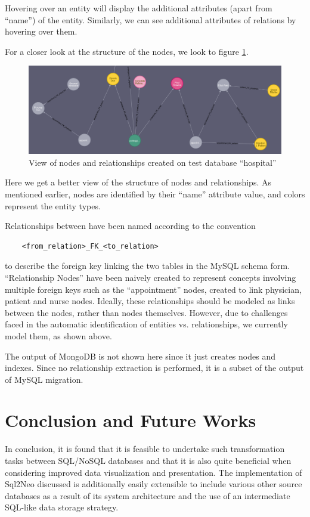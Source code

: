 \documentclass[12pt]{article}
\newcommand{\sectionfontstyle}{\fontsize{16pt}{1em}\usefont{T1}{phv}{b}{n}}
\begin{document}
    Hovering over an entity will display the additional attributes (apart from ``name'') of the entity. Similarly, we can see additional attributes of relations by hovering over them. 

    For a closer look at the structure of the nodes, we look to figure \ref{fig:node_subset}.

    \begin{figure}[htb!]
        \centering
        \includegraphics[width=155mm]{img/node_subset.png}
        \caption{View of nodes and relationships created on test database ``hospital''}
        \label{fig:node_subset}
    \end{figure}

    Here we get a better view of the structure of nodes and relationships. As mentioned earlier, nodes are identified by their ``name'' attribute value, and colors represent the entity types. 

    Relationships between have been named according to the convention 
    \begin{lstlisting}
    <from_relation>_FK_<to_relation>    
    \end{lstlisting} 
    to describe the foreign key linking the two tables in the MySQL schema form. ``Relationship Nodes'' have been naively created to represent concepts involving multiple foreign keys such as the ``appointment'' nodes, created to link physician, patient and nurse nodes. Ideally, these relationships should be modeled as links between the nodes, rather than nodes themselves. However, due to challenges faced in the automatic identification of entities vs. relationships, we currently model them, as shown above.

    The output of MongoDB is not shown here since it just creates nodes and indexes. Since no relationship extraction is performed, it is a subset of the output of MySQL migration.

    \newpage

    \section{\sectionfontstyle Conclusion and Future Works}
    In conclusion, it is found that it is feasible to undertake such transformation tasks between SQL/NoSQL databases and that it is also quite beneficial when considering improved data visualization and presentation. The implementation of Sql2Neo discussed is additionally easily extensible to include various other source databases as a result of its system architecture and the use of an intermediate SQL-like data storage strategy.
\end{document}
